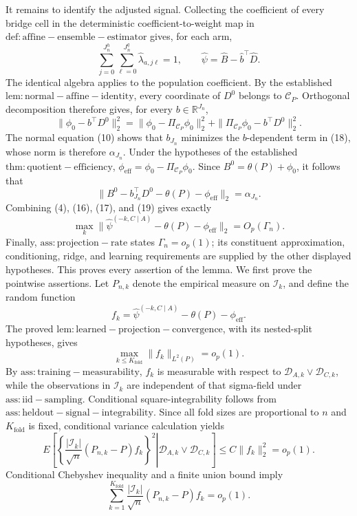 It remains to identify the adjusted signal.  Collecting the coefficient of every bridge cell in the deterministic coefficient-to-weight map in \(\mathrm{def:affine-ensemble-estimator}\) gives, for each arm,
\[
 \sum_{j=0}^{J_n^h}\sum_{\ell=0}^{J_n^q}\widehat\lambda_{a,j\ell}=1,
 \qquad
 \widehat\psi=\widehat B-\widehat b^\top\widehat D.                     \tag{17}
\]
The identical algebra applies to the population coefficient.  By the established \(\mathrm{lem:normal-affine-identity}\), every coordinate of \(D^0\) belongs to \(\mathcal C_P\).  Orthogonal decomposition therefore gives, for every \(b\in\mathbb R^{J_n}\),
\[
 \|\phi_0-b^\top D^0\|_2^2
 =\|\phi_0-\Pi_{\mathcal C_P}\phi_0\|_2^2
  +\|\Pi_{\mathcal C_P}\phi_0-b^\top D^0\|_2^2.                         \tag{18}
\]
The normal equation (10) shows that \(b_{J_n}\) minimizes the \(b\)-dependent term in (18), whose norm is therefore \(\alpha_{J_n}\).  Under the hypotheses of the established \(\mathrm{thm:quotient-efficiency}\),
\(\phi_{\mathrm{eff}}=\phi_0-\Pi_{\mathcal C_P}\phi_0\).  Since \(B^0=\theta(P)+\phi_0\), it follows that
\[
 \|B^0-b_{J_n}^\top D^0-\theta(P)-\phi_{\mathrm{eff}}\|_2
 =\alpha_{J_n}.                                                             \tag{19}
\]
Combining (4), (16), (17), and (19) gives exactly
\[
 \max_k\|\widehat\psi^{(-k,C\mid A)}-\theta(P)-\phi_{\mathrm{eff}}\|_2
 =O_p(\Gamma_n).
\]
Finally, \(\mathrm{ass:projection-rate}\) states \(\Gamma_n=o_p(1)\); its constituent approximation, conditioning, ridge, and learning requirements are supplied by the other displayed hypotheses.  This proves every assertion of the lemma.
We first prove the pointwise assertions.  Let \(P_{n,k}\) denote the empirical measure on \(\mathcal I_k\), and define the random function
\[
 f_k=\widehat\psi^{(-k,C\mid A)}-\theta(P)-\phi_{\mathrm{eff}}.
\]
The proved \(\mathrm{lem:learned-projection-convergence}\), with its nested-split hypotheses, gives
\[
 \max_{k\le K_{\mathrm{fold}}}\|f_k\|_{L^2(P)}=o_p(1).                   \tag{20}
\]
By \(\mathrm{ass:training-measurability}\), \(f_k\) is measurable with respect to \(\mathcal D_{A,k}\vee\mathcal D_{C,k}\), while the observations in \(\mathcal I_k\) are independent of that sigma-field under \(\mathrm{ass:iid-sampling}\).  Conditional square-integrability follows from \(\mathrm{ass:heldout-signal-integrability}\).  Since all fold sizes are proportional to \(n\) and \(K_{\mathrm{fold}}\) is fixed, conditional variance calculation yields
\[
 E\!\left[
 \left.\left\{\frac{|\mathcal I_k|}{\sqrt n}(P_{n,k}-P)f_k\right\}^2
 \right|\mathcal D_{A,k}\vee\mathcal D_{C,k}\right]
 \le C\|f_k\|_2^2=o_p(1).                                                  \tag{21}
\]
Conditional Chebyshev inequality and a finite union bound imply
\[
 \sum_{k=1}^{K_{\mathrm{fold}}}\frac{|\mathcal I_k|}{\sqrt n}
 (P_{n,k}-P)f_k=o_p(1).                                                      \tag{22}
\]

